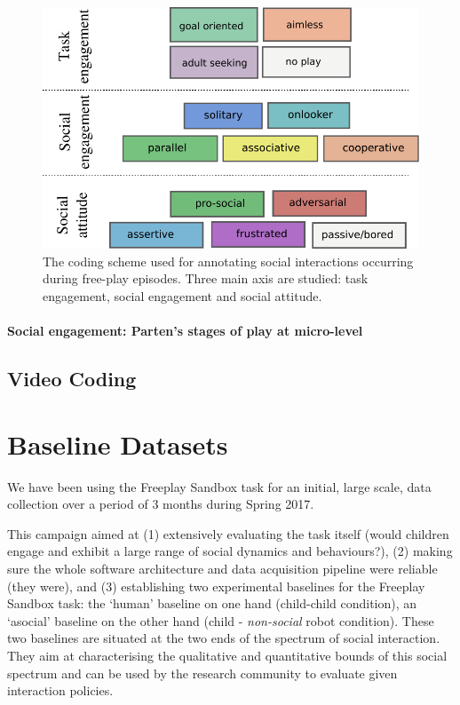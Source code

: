 \documentclass[sigconf]{acmart}
\begin{document}
\begin{figure}
    \centering
    \includegraphics[width=\columnwidth]{coding-scheme}
    \caption{The coding scheme used for annotating social interactions occurring
    during free-play episodes. Three main axis are studied: task engagement,
    social engagement and social attitude.}
    \label{fig|coding-scheme}
\end{figure}

\paragraph{Social engagement: Parten's stages of play at micro-level}

\subsection{Video Coding}


\section{Baseline Datasets}
\label{sec:dataset}

We have been using the Freeplay Sandbox task for an initial, large scale, data
collection over a period of 3 months during Spring 2017.

This campaign aimed at (1) extensively evaluating the task itself (would
children engage and exhibit a large range of social dynamics and behaviours?),
(2) making sure the whole software architecture and data acquisition pipeline
were reliable (they were), and (3) establishing two experimental baselines for
the Freeplay Sandbox task: the `human' baseline on one hand (child-child
condition), an `asocial' baseline on the other hand (child - \emph{non-social}
robot condition). These two baselines are situated at the two ends of the
spectrum of social interaction. They aim at characterising the qualitative and
quantitative bounds of this social spectrum and can be used by the research
community to evaluate given interaction policies.
\end{document}
